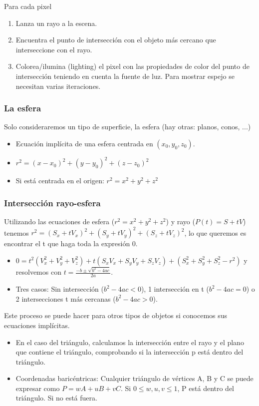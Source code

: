 Para cada pixel
\begin{enumerate}
    \item Lanza un rayo a la escena.
    \item Encuentra el punto de intersección con el objeto más cercano que interseccione con el rayo.
    \item Colorea/ilumina (lighting) el pixel con las propiedades de color del punto de intersección teniendo en cuenta la fuente de luz. Para mostrar espejo se necesitan varias iteraciones.
\end{enumerate}

\subsubsection{La esfera} 
Solo consideraremos un tipo de superficie, la esfera (hay otras: planos, conos, ...)
\begin{itemize}
    \item Ecuación implícita de una esfera centrada en $(x_0, y_0, z_0)$.
    \item $r^2=(x-x_0)^2+(y-y_0)^2+(z-z_0)^2$
    \item Si está centrada en el origen: $r^2=x^2+y^2+z^2$
\end{itemize}

\subsubsection{Intersección rayo-esfera} 
Utilizando las ecuaciones de esfera ($r^2=x^2+y^2+z^2$) y rayo ($P(t)=S+tV$) tenemos $r^2=(S_x+tV_x)^2+(S_y+tV_y)^2+(S_z+tV_z)^2$, lo que queremos es encontrar el t que haga toda la expresión 0.
\begin{itemize}
    \item $0=t^2(V_x^2+V_y^2+V_z^2)+t(S_xV_x+S_yV_y+S_zV_z)+(S_x^2+S_y^2+S_z^2-r^2)$ y resolvemos con $t=\frac{-b \pm \sqrt{b^2-4ac}}{2a}$.
    \item Tres casos: Sin intersección ($b^2-4ac <0$), 1 intersección en t ($b^2-4ac =0$) o 2 intersecciones t más cercanas ($b^2-4ac >0$).
\end{itemize}

Este proceso se puede hacer para otros tipos de objetos si conocemos sus ecuaciones implícitas.
\begin{itemize}
    \item En el caso del triángulo, calculamos la intersección entre el rayo y el plano que contiene el triángulo, comprobando si la intersección p está dentro del triángulo.
    \item Coordenadas baricéntricas: Cualquier triángulo de vértices A, B y C se puede expresar como $P=wA+uB+vC$. Si $0\leq w, u, v \leq 1$, P está dentro del triángulo. Si no está fuera.
\end{itemize}


